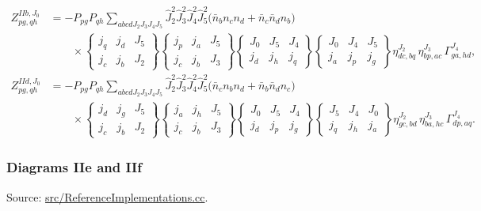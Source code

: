 \documentclass[
]{article}
\begin{document}
\begin{equation}
\begin{aligned}
Z^{IIb,J_0}_{pg,qh}
&=-P_{pg}P_{qh}\sum_{abcdJ_2J_3J_4J_5}
\hat J_2^2\hat J_3^2\hat J_4^2\hat J_5^2
\Big(\bar n_b n_c n_d+\bar n_c\bar n_d n_b\Big) \\
&\qquad\times
\begin{Bmatrix} j_q&j_d&J_5\\ j_c&j_b&J_2\end{Bmatrix}
\begin{Bmatrix} j_p&j_a&J_5\\ j_c&j_b&J_3\end{Bmatrix}
\begin{Bmatrix} J_0&J_5&J_4\\ j_d&j_h&j_q\end{Bmatrix}
\begin{Bmatrix} J_0&J_4&J_5\\ j_a&j_p&j_g\end{Bmatrix}
\eta^{J_2}_{dc,bq}\,
\eta^{J_3}_{bp,ac}\,
\Gamma^{J_4}_{ga,hd},\\
Z^{IId,J_0}_{pg,qh}
&=-P_{pg}P_{qh}\sum_{abcdJ_2J_3J_4J_5}
\hat J_2^2\hat J_3^2\hat J_4^2\hat J_5^2
\Big(\bar n_c n_b n_d+\bar n_b\bar n_d n_c\Big) \\
&\qquad\times
\begin{Bmatrix} j_d&j_g&J_5\\ j_c&j_b&J_2\end{Bmatrix}
\begin{Bmatrix} j_a&j_h&J_5\\ j_c&j_b&J_3\end{Bmatrix}
\begin{Bmatrix} J_0&J_5&J_4\\ j_d&j_p&j_g\end{Bmatrix}
\begin{Bmatrix} J_5&J_4&J_0\\ j_q&j_h&j_a\end{Bmatrix}
\eta^{J_2}_{gc,bd}\,
\eta^{J_3}_{ba,hc}\,
\Gamma^{J_4}_{dp,aq}.
\end{aligned}
\end{equation}

\subsubsection{Diagrams IIe and IIf}\label{diagrams-iie-and-iif}

Source:
\href{../src/ReferenceImplementations.cc\#L8633-L9061}{src/ReferenceImplementations.cc}.
\end{document}
